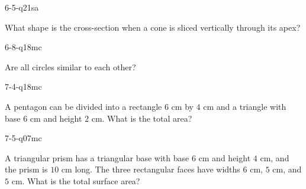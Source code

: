 \begin{practiceQuestion}{6-5-q21}{sa}
\begin{questionText}
What shape is the cross-section when a cone is sliced vertically through its apex?
\end{questionText}
\end{practiceQuestion}

\begin{practiceQuestion}{6-8-q18}{mc}
\begin{questionText}
Are all circles similar to each other?
\end{questionText}
\end{practiceQuestion}

\begin{practiceQuestion}{7-4-q18}{mc}
\begin{questionText}
A pentagon can be divided into a rectangle $6$ cm by $4$ cm and a triangle with base $6$ cm and height $2$ cm. What is the total area?
\end{questionText}
\end{practiceQuestion}

\begin{practiceQuestion}{7-5-q07}{mc}
\begin{questionText}
A triangular prism has a triangular base with base $6$ cm and height $4$ cm, and the prism is $10$ cm long. The three rectangular faces have widths $6$ cm, $5$ cm, and $5$ cm. What is the total surface area?
\end{questionText}
\end{practiceQuestion}

